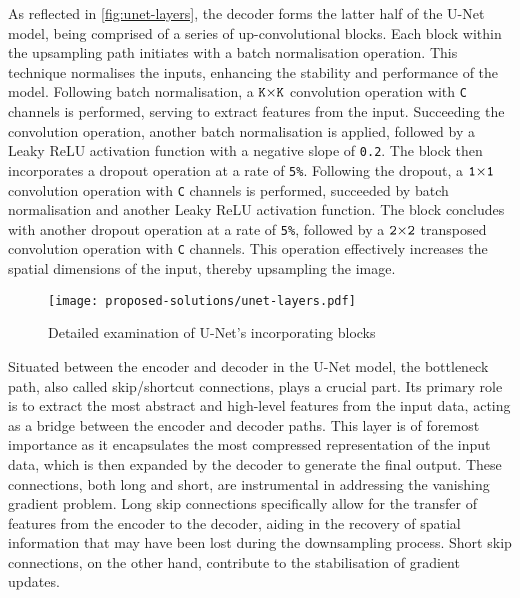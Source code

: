 As reflected in \autoref{fig:unet-layers}, the decoder forms the latter half of the U-Net model, being comprised of a series of up-convolutional blocks. Each block within the upsampling path initiates with a batch normalisation operation. This technique normalises the inputs, enhancing the stability and performance of the model. Following batch normalisation, a $\text{\texttt{K}} {\times} \text{\texttt{K}}$ convolution operation with \texttt{C} channels is performed, serving to extract features from the input. Succeeding the convolution operation, another batch normalisation is applied, followed by a Leaky ReLU activation function with a negative slope of \texttt{0.2}. The block then incorporates a dropout operation at a rate of \texttt{5\%}. Following the dropout, a $\text{\texttt{1}} {\times} \text{\texttt{1}}$ convolution operation with \texttt{C} channels is performed, succeeded by batch normalisation and another Leaky ReLU activation function. The block concludes with another dropout operation at a rate of \texttt{5\%}, followed by a $\text{\texttt{2}} {\times} \text{\texttt{2}}$ transposed convolution operation with \texttt{C} channels. This operation effectively increases the spatial dimensions of the input, thereby upsampling the image.
\begin{figure}[ht]
    \centering
    \texttt{[image: proposed-solutions/unet-layers.pdf]}
    \caption{Detailed examination of U-Net's incorporating blocks}
    \label{fig:unet-layers}
\end{figure}


Situated between the encoder and decoder in the U-Net model, the bottleneck path, also called skip/shortcut connections, plays a crucial part. Its primary role is to extract the most abstract and high-level features from the input data, acting as a bridge between the encoder and decoder paths. This layer is of foremost importance as it encapsulates the most compressed representation of the input data, which is then expanded by the decoder to generate the final output. These connections, both long and short, are instrumental in addressing the vanishing gradient problem. Long skip connections specifically allow for the transfer of features from the encoder to the decoder, aiding in the recovery of spatial information that may have been lost during the downsampling process. Short skip connections, on the other hand, contribute to the stabilisation of gradient updates.

